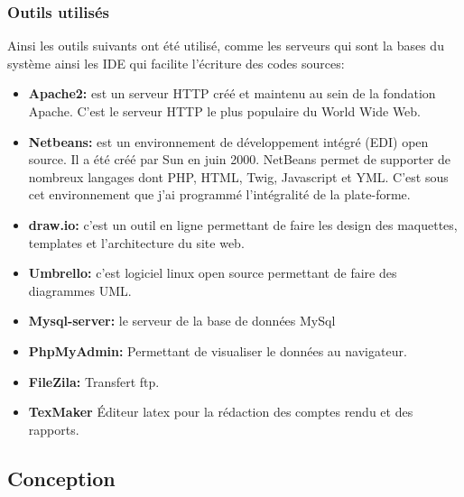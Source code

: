 \documentclass[12pt]{article}
\begin{document}
\subsubsection{Outils utilisés }

Ainsi les outils suivants ont été utilisé, comme les serveurs qui sont la bases du système  ainsi les IDE qui facilite 
l’écriture des codes sources:
\begin{itemize}
\item  \textbf{Apache2:} est un serveur HTTP créé et maintenu au sein de la fondation Apache. C'est le serveur HTTP le plus populaire du World Wide Web.

\item  \textbf{Netbeans:} est un environnement de développement intégré (EDI) open source. Il a
été créé par Sun en juin 2000. NetBeans permet de supporter de nombreux
langages dont PHP, HTML, Twig, Javascript et YML. C’est sous cet
environnement que j’ai programmé l’intégralité de la plate-forme.


\item \textbf{draw.io:} c'est un outil en ligne permettant de faire les design des maquettes, templates et l’architecture
 du site web.

\item \textbf{Umbrello:} c'est logiciel linux open source permettant de faire des diagrammes UML.

\item \textbf{Mysql-server:} le serveur de la base de données MySql

\item \textbf{PhpMyAdmin: } Permettant de visualiser le données au navigateur.

\item \textbf{FileZila:} Transfert ftp.

\item \textbf{TexMaker} Éditeur latex pour la rédaction des comptes rendu et des rapports.
\end{itemize}


\subsection{Conception}
\end{document}

